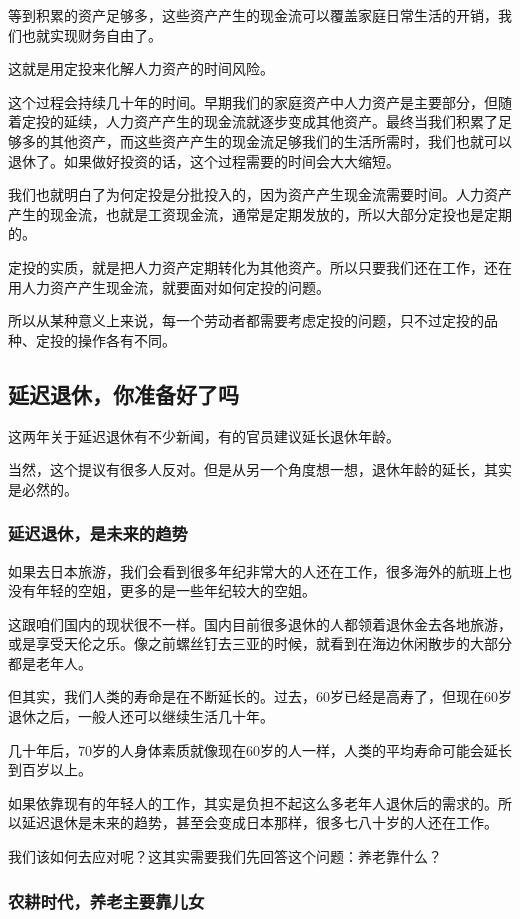 等到积累的资产足够多，这些资产产生的现金流可以覆盖家庭日常生活的开销，我们也就实现财务自由了。

这就是用定投来化解人力资产的时间风险。

这个过程会持续几十年的时间。早期我们的家庭资产中人力资产是主要部分，但随着定投的延续，人力资产产生的现金流就逐步变成其他资产。最终当我们积累了足够多的其他资产，而这些资产产生的现金流足够我们的生活所需时，我们也就可以退休了。如果做好投资的话，这个过程需要的时间会大大缩短。

我们也就明白了为何定投是分批投入的，因为资产产生现金流需要时间。人力资产产生的现金流，也就是工资现金流，通常是定期发放的，所以大部分定投也是定期的。

定投的实质，就是把人力资产定期转化为其他资产。所以只要我们还在工作，还在用人力资产产生现金流，就要面对如何定投的问题。

所以从某种意义上来说，每一个劳动者都需要考虑定投的问题，只不过定投的品种、定投的操作各有不同。

\subsection{延迟退休，你准备好了吗}
这两年关于延迟退休有不少新闻，有的官员建议延长退休年龄。

当然，这个提议有很多人反对。但是从另一个角度想一想，退休年龄的延长，其实是必然的。

\subsubsection{延迟退休，是未来的趋势}

如果去日本旅游，我们会看到很多年纪非常大的人还在工作，很多海外的航班上也没有年轻的空姐，更多的是一些年纪较大的空姐。

这跟咱们国内的现状很不一样。国内目前很多退休的人都领着退休金去各地旅游，或是享受天伦之乐。像之前螺丝钉去三亚的时候，就看到在海边休闲散步的大部分都是老年人。

但其实，我们人类的寿命是在不断延长的。过去，60岁已经是高寿了，但现在60岁退休之后，一般人还可以继续生活几十年。

几十年后，70岁的人身体素质就像现在60岁的人一样，人类的平均寿命可能会延长到百岁以上。

如果依靠现有的年轻人的工作，其实是负担不起这么多老年人退休后的需求的。所以延迟退休是未来的趋势，甚至会变成日本那样，很多七八十岁的人还在工作。

我们该如何去应对呢？这其实需要我们先回答这个问题：养老靠什么？

\subsubsection{农耕时代，养老主要靠儿女}

